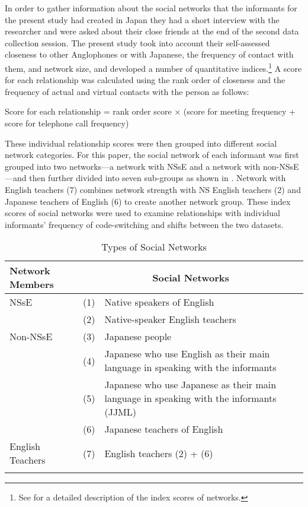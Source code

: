 \documentclass[output=paper]{LSP/langsci}
\begin{document}
In order to gather information about the social networks that the informants for the present study had created in Japan they had a short interview with the researcher and were asked about their close friends at the end of the second data collection session. The present study took into account their self-assessed closeness to other Anglophones or with Japanese, the frequency of contact with them, and network size, and developed a number of quantitative indices.\footnote{See \citet{hirano_dialect_2013} for a detailed description of the index scores of networks.} A score for each relationship was calculated using the rank order of closeness and the frequency of actual and virtual contacts with the person as follows:

Score for each relationship =   rank order score × (score for meeting frequency + score for             telephone call frequency)

These individual relationship scores were then grouped into different social network categories. For this paper, the social network of each informant was first grouped into two networks—a network with NSsE and a network with non-NSsE—and then further divided into seven sub-groups as shown in . Network with English teachers (7) combines network strength with NS English teachers (2) and Japanese teachers of English (6) to create another network group. These index scores of social networks were used to examine relationships with individual informants’ frequency of code-switching and shifts between the two datasets.

\begin{table}
\begin{tabular}{lll}
\lsptoprule
Network Members & \multicolumn{2}{c}{Social Networks}\\
\midrule
NSsE & (1) & Native speakers of English\\
& (2) & Native-speaker English teachers\\
Non-NSsE & (3) & Japanese people\\
& (4) & \begin{minipage}[t]{0.6\textwidth}Japanese who use English as their main language in speaking with the informants\end{minipage}   \\
& (5) & \begin{minipage}[t]{0.6\textwidth}Japanese who use Japanese as their main language in speaking with the informants (JJML)\end{minipage}\\
& (6) & Japanese teachers of English\\
English Teachers & (7) & English teachers (2) + (6)\\
\lspbottomrule
\end{tabular}
\label{tab:1}
\caption{Types of Social Networks}
\end{table}
\end{document}
